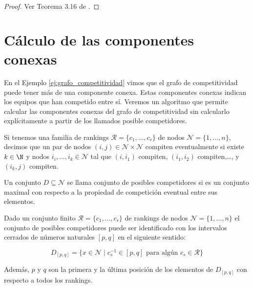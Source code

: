 \begin{proof}
Ver Teorema 3.16 de \cite{journals/corr/CriadoGPR13a}.
\end{proof}


\section{Cálculo de las componentes conexas}

En el Ejemplo \ref{ej:grafo_competitividad} vimos que el grafo de competitividad puede tener más de una componente conexa. Estas componentes conexas indican los equipos que han competido entre sí. Veremos un algoritmo que permite calcular las componentes conexas del grafo de competitividad sin calcularlo explícitamente a partir de los llamados posible competidores.

\begin{defi}
Si tenemos una familia de rankings $\mathcal{R} = \{c_1,\dots,c_r\}$ de nodos $\mathcal{N} = \{1,\dots,n\}$, decimos que un par de nodos $(i,j) \in \mathcal{N} \times \mathcal{N}$ compiten eventualmente si existe $k \in \N$ y nodos $i_i,\dots,i_k \in \mathcal{N}$ tal que $(i,i_1)$ compiten, $(i_1,i_2)$ compiten,\dots, y $(i_k,j)$ compiten. 
\end{defi}

\begin{defi}
Un conjunto $D \subseteq \mathcal{N}$ se llama conjunto de posibles competidores si es un conjunto maximal con respecto a la propiedad de competición eventual entre sus elementos.
\end{defi}

\begin{teo}
Dado un conjunto finito $\mathcal{R} = \{ c_1, \dots, c_r \}$ de rankings de nodos $\mathcal{N} = \{1,\dots, n\}$ el conjunto de posibles competidores puede ser identificado con los intervalos cerrados de números naturales $[p,q]$ en el siguiente sentido:

\begin{equation*}
D_{[p,q]} = \{ x \in \mathcal{N} \mid c_s^{-1} \in [p,q] \text{ para algún } c_s \in \mathcal{R} \}
\end{equation*}

Además, $p$ y $q$ son la primera y la última posición de los elementos de $D_{[p,q]}$ con respecto a todos los rankings.
\end{teo} 

